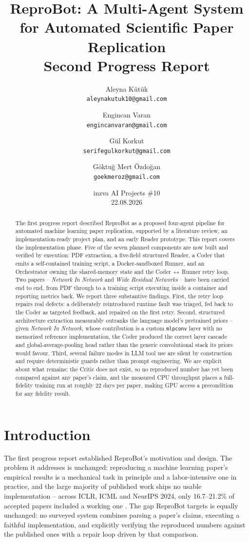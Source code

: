\documentclass[11pt]{article}
\title{\textbf{ReproBot: A Multi-Agent System for Automated Scientific Paper Replication}\\[0.4em]
\large Second Progress Report}
\author{
  Aleyna Kütük \\ \small\texttt{aleynakutuk10@gmail.com}
  \and
  Engincan Varan \\ \small\texttt{engincanvaran@gmail.com}
  \and
  Gül Korkut \\ \small\texttt{serifegulkorkut@gmail.com}
  \and
  Göktuğ Mert Özdoğan \\ \small\texttt{goekmeroz@gmail.com}
}
\date{inzva AI Projects \#10 \\ 22.08.2026}
\begin{document}
\maketitle

\begin{abstract}
The first progress report described ReproBot as a proposed four-agent pipeline for
automated machine learning paper replication, supported by a literature review, an
implementation-ready project plan, and an early Reader prototype. This report covers the
implementation phase. Five of the seven planned components are now built and verified by
execution: PDF extraction, a five-field structured Reader, a Coder that emits a
self-contained training script, a Docker-sandboxed Runner, and an Orchestrator owning the
shared-memory state and the Coder\,$\leftrightarrow$\,Runner retry loop. Two papers --
\emph{Network In Network} and \emph{Wide Residual Networks} -- have been carried end to
end, from PDF through to a training script executing inside a container and reporting
metrics back. We report three substantive findings. First, the retry loop repairs real
defects: a deliberately reintroduced runtime fault was triaged, fed back to the Coder as
targeted feedback, and repaired on the first retry. Second, structured architecture
extraction measurably outranks the language model's pretrained priors -- given
\emph{Network In Network}, whose contribution is a custom \texttt{mlpconv} layer with no
memorized reference implementation, the Coder produced the correct layer cascade and
global-average-pooling head rather than the generic convolutional stack its priors would
favour. Third, several failure modes in LLM tool use are silent by construction and
require deterministic guards rather than prompt engineering. We are explicit about what
remains: the Critic does not exist, so no reproduced number has yet been compared against
any paper's claim, and the measured CPU throughput places a full-fidelity training run at
roughly 22 days per paper, making GPU access a precondition for any fidelity result.
\end{abstract}

\section{Introduction}
\label{sec:intro}

The first progress report \cite{reprobot2026first} established ReproBot's motivation and
design. The problem it addresses is unchanged: reproducing a machine learning paper's
empirical results is a mechanical task in principle and a labor-intensive one in
practice, and the large majority of published work ships no usable implementation --
across ICLR, ICML and NeurIPS 2024, only 16.7--21.2\% of accepted papers included a
working one \cite{seo2025papercoder}. The gap ReproBot targets is equally unchanged: no
surveyed system combines parsing a paper's claims, executing a faithful implementation,
and explicitly verifying the reproduced numbers against the published ones with a repair
loop driven by that comparison.
\end{document}
